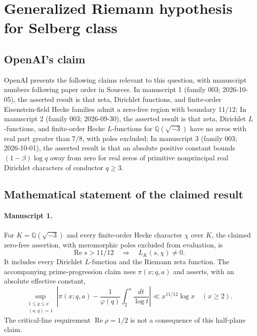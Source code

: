 \documentclass[11pt]{article}
\begin{document}
\section*{Generalized Riemann hypothesis for Selberg class}

\subsection{OpenAI's claim}
OpenAI presents the following claims relevant to this question, with manuscript numbers following paper order in Sources. In manuscript 1 (family 003; 2026-10-05), the asserted result is that zeta, Dirichlet functions, and finite-order Eisenstein-field Hecke families admit a zero-free region with boundary $11/12$; In manuscript 2 (family 003; 2026-09-30), the asserted result is that zeta, Dirichlet $L$-functions, and finite-order Hecke $L$-functions for $\mathbb Q(\sqrt{-3})$ have no zeros with real part greater than $7/8$, with poles excluded; In manuscript 3 (family 003; 2026-10-01), the asserted result is that an absolute positive constant bounds $(1-\beta)\log q$ away from zero for real zeros of primitive nonprincipal real Dirichlet characters of conductor $q\ge3$.

\subsection{Mathematical statement of the claimed result}
\paragraph{Manuscript 1.}
For $K=\mathbb Q(\sqrt{-3})$ and every finite-order Hecke character $\chi$ over $K$, the claimed zero-free assertion, with meromorphic poles excluded from evaluation, is
\[
 \operatorname{Re}s>11/12\quad\Longrightarrow\quad L_K(s,\chi)\ne0.
\]
It includes every Dirichlet $L$-function and the Riemann zeta function. The accompanying prime-progression claim uses $\pi(x;q,a)$ and asserts, with an absolute effective constant,
\[
 \sup_{\substack{1\le q\le x\\(a,q)=1}}
 \left|\pi(x;q,a)-\frac1{\varphi(q)}\int_2^x\frac{dt}{\log t}\right|
 \ll x^{11/12}\log x\quad(x\ge2).
\]
The critical-line requirement $\operatorname{Re}\rho=1/2$ is not a consequence of this half-plane claim.
\end{document}
